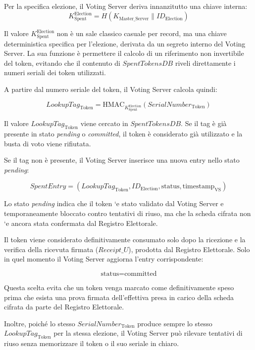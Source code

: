 \documentclass[a4paper,12pt]{article}
\begin{document}
Per la specifica elezione, il Voting Server deriva innanzitutto una chiave interna:
\[
K_{\text{Spent}}^{\text{Election}} = H(K_{\text{Master\_Server}} \parallel \mathit{ID}_{\text{Election}})
\]

Il valore $K_{\text{Spent}}^{\text{Election}}$ non è un sale classico casuale per record, ma una chiave deterministica specifica per l'elezione, derivata da un segreto interno del Voting Server.
La sua funzione è permettere il calcolo di un riferimento non invertibile del token, evitando che il contenuto di $\mathit{SpentTokensDB}$ riveli direttamente i numeri seriali dei token utilizzati.

A partire dal numero seriale del token, il Voting Server calcola quindi:

\[
\mathit{LookupTag}_{\text{Token}} = \text{HMAC}_{K_{\text{Spent}}^{\text{Election}}}(\mathit{SerialNumber}_{\text{Token}})
\]

Il valore $\mathit{LookupTag}_{\text{Token}}$ viene cercato in $\mathit{SpentTokensDB}$.
Se il tag è già presente in stato \emph{pending} o \emph{committed}, il token è considerato già utilizzato e la busta di voto viene rifiutata.

Se il tag non è presente, il Voting Server inserisce una nuova entry nello stato \emph{pending}:

\[
\mathit{SpentEntry} = (\mathit{LookupTag}_{\text{Token}}, \mathit{ID}_{\text{Election}}, \text{status}, \text{timestamp}_{\text{VS}})
\]

Lo stato \emph{pending} indica che il token `e stato validato dal Voting Server e temporaneamente bloccato contro tentativi di riuso, ma che la scheda cifrata non `e ancora stata confermata dal Registro Elettorale.

Il token viene considerato definitivamente consumato solo dopo la ricezione e la verifica della ricevuta firmata ($\mathit{Receipt\_U}$), prodotta dal Registro Elettorale.
Solo in quel momento il Voting Server aggiorna l'entry corrispondente:

\[
\text{status} = \text{committed}
\]

Questa scelta evita che un token venga marcato come definitivamente speso prima che esista una prova firmata dell'effettiva presa in carico della scheda cifrata da parte del Registro Elettorale.

Inoltre, poiché lo stesso $\mathit{SerialNumber}_{\text{Token}}$ produce sempre lo stesso $\mathit{LookupTag}_{\text{Token}}$ per la stessa elezione, il Voting Server può rilevare tentativi di riuso senza memorizzare il token o il suo seriale in chiaro.
\end{document}
